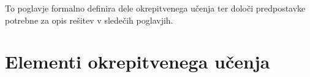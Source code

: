 \documentclass[a4paper, oneside, 12pt]{report}
\begin{document}



To poglavje formalno definira dele okrepitvenega učenja ter določi predpostavke potrebne za opis rešitev v sledečih poglavjih.

\section{Elementi okrepitvenega učenja} \label{section:ReinforcementLearningElements}
\end{document}
